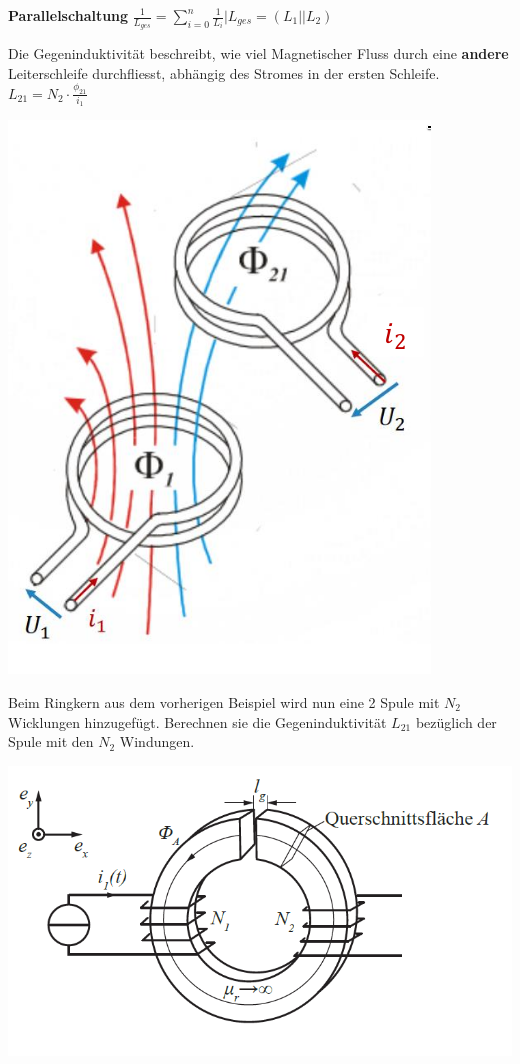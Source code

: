 		\textbf{Parallelschaltung}
		\formulaBegin
		$\displaystyle \frac{1}{L_{ges}} = \sum_{i=0}^n \frac{1}{L_i} \Bigg\rvert L_{ges} = (L_1 || L_2 )$
		\formulaEnd
	 \iend
\newpage


\beginip
Die Gegeninduktivität beschreibt, wie viel Magnetischer Fluss durch eine \textbf{andere} Leiterschleife durchfliesst, abhängig
des Stromes in der ersten Schleife.
\formulaBegin
$\displaystyle L_{21} = N_2 \cdot \frac{\phi_{21}}{i_1}$
\formulaEnd
\begin{center}

	\includegraphics[scale=0.3]{img/gegenind}
\end{center}
\iend


\beginbsp
Beim Ringkern aus dem vorherigen Beispiel wird nun eine 2 Spule mit $N_2$ Wicklungen hinzugefügt. Berechnen sie die Gegeninduktivität $L_{21}$ bezüglich der Spule mit den $N_2$ Windungen.
\begin{center}

	\includegraphics[scale=0.5]{img/induktivitaet_bsp_2.png}
\end{center}
\iend

